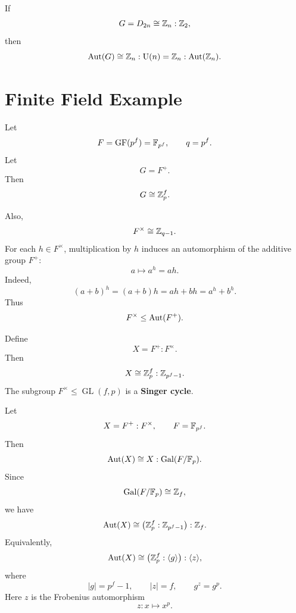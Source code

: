 \begin{remark}
If
\[
    G=D_{2n}\cong \mathbb{Z}_n:\mathbb{Z}_2,
\]
then
\[
    \operatorname{Aut}(G)
    \cong
    \mathbb{Z}_n:\mathrm{U}(n)
    =
    \mathbb{Z}_n:\operatorname{Aut}(\mathbb{Z}_n).
\]
\end{remark}

\section{Finite Field Example}

\begin{example}
Let
\[
    F=\operatorname{GF}(p^f)=\mathbb{F}_{p^f},
    \qquad
    q=p^f.
\]
Let
\[
    G=F^+.
\]
Then
\[
    G\cong \mathbb{Z}_p^f.
\]

Also,
\[
    F^\times\cong \mathbb{Z}_{q-1}.
\]
For each $h\in F^\times$, multiplication by $h$ induces an automorphism of the additive group $F^+$:
\[
    a\longmapsto a^h=ah.
\]
Indeed,
\[
    (a+b)^h
    =
    (a+b)h
    =
    ah+bh
    =
    a^h+b^h.
\]
Thus
\[
    F^\times\leq \operatorname{Aut}(F^+).
\]

Define
\[
    X=F^+:F^\times.
\]
Then
\[
    X\cong \mathbb{Z}_p^f:\mathbb{Z}_{p^f-1}.
\]
The subgroup $F^\times\leq \operatorname{GL}(f,p)$ is a \textbf{Singer cycle}.
\end{example}

\begin{proposition}
Let
\[
    X=F^+:F^\times,
    \qquad
    F=\mathbb{F}_{p^f}.
\]
Then
\[
    \operatorname{Aut}(X)
    \cong
    X:\operatorname{Gal}(F/\mathbb{F}_p).
\]
Since
\[
    \operatorname{Gal}(F/\mathbb{F}_p)\cong \mathbb{Z}_f,
\]
we have
\[
    \operatorname{Aut}(X)
    \cong
    \bigl(\mathbb{Z}_p^f:\mathbb{Z}_{p^f-1}\bigr):\mathbb{Z}_f.
\]
Equivalently,
\[
    \operatorname{Aut}(X)
    \cong
    \bigl(\mathbb{Z}_p^f:\langle g\rangle\bigr):\langle z\rangle,
\]
where
\[
    |g|=p^f-1,
    \qquad
    |z|=f,
    \qquad
    g^z=g^p.
\]
Here $z$ is the Frobenius automorphism
\[
    z:x\longmapsto x^p.
\]
\end{proposition}

